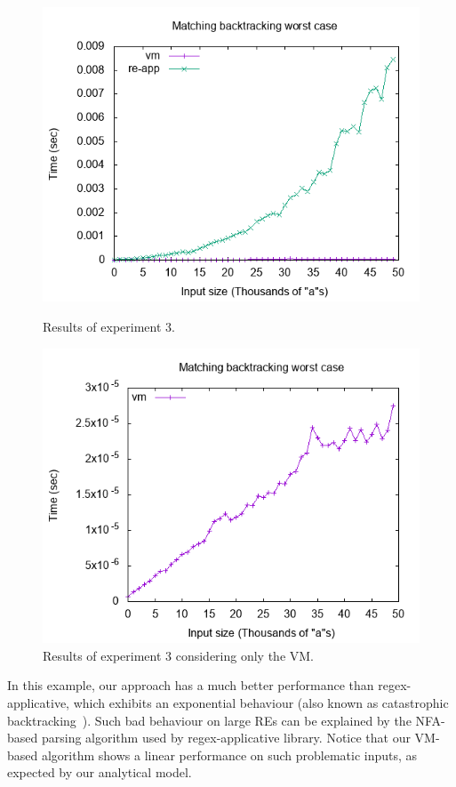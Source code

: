 \documentclass[review]{elsarticle}
\theoremstyle{definition}
\begin{document}
\begin{figure}[h]
  \centering
  \begin{minipage}{0.45\textwidth}
    \includegraphics[width=.9\textwidth]{backtrack.png}
    \caption{Results of experiment 3.}
    \label{fig:graph3}
  \end{minipage} \hfill
  \begin{minipage}{0.45\textwidth}
    \includegraphics[width=.9\textwidth]{back1.png}
    \caption{Results of experiment 3 considering only the VM.}
    \label{fig:graph4}
  \end{minipage}
\end{figure}

In this example, our approach has a much better performance than
regex-applicative, which exhibits an exponential behaviour (also known as
catastrophic backtracking~\cite{Kirrage13}). Such bad 
behaviour on large REs can be explained by the NFA-based parsing algorithm  
used by regex-applicative library. Notice that our VM-based algorithm shows 
a linear performance on such problematic inputs, as expected by our
analytical model.
\end{document}
